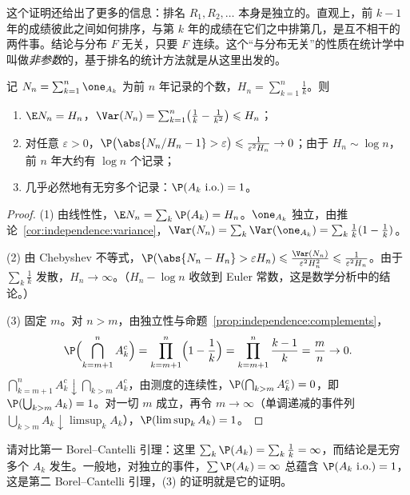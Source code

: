 \begin{remark}
这个证明还给出了更多的信息：排名 $R_1,R_2,\dots$ 本身是独立的。直观上，前 $k-1$ 年的成绩彼此之间如何排序，与第 $k$ 年的成绩在它们之中排第几，是互不相干的两件事。结论与分布 $F$ 无关，只要 $F$ 连续。这个“与分布无关”的性质在统计学中叫做\emph{非参数}的，基于排名的统计方法就是从这里出发的。
\end{remark}

\begin{corollary}[记录的个数]\label{cor:independence:records-count}
记 $N_n=\sum_{k=1}^n\one_{A_k}$ 为前 $n$ 年记录的个数，$H_n=\sum_{k=1}^n\frac1k$。则
\begin{enumerate}
\item $\E N_n=H_n$，$\Var(N_n)=\sum_{k=1}^n\bigl(\frac1k-\frac1{k^2}\bigr)\leqslant H_n$；
\item 对任意 $\varepsilon>0$，$\P\bigl(\abs{N_n/H_n-1}>\varepsilon\bigr)\leqslant\frac1{\varepsilon^2H_n}\to0$；由于 $H_n\sim\log n$，前 $n$ 年大约有 $\log n$ 个记录；
\item 几乎必然地有无穷多个记录：$\P(A_k\ \text{i.o.})=1$。
\end{enumerate}
\end{corollary}
\begin{proof}
(1) 由线性性，$\E N_n=\sum_k\P(A_k)=H_n$。$\one_{A_k}$ 独立，由推论~\ref{cor:independence:variance}，$\Var(N_n)=\sum_k\Var(\one_{A_k})=\sum_k\frac1k(1-\frac1k)$。

(2) 由 Chebyshev 不等式，$\P(\abs{N_n-H_n}>\varepsilon H_n)\leqslant\frac{\Var(N_n)}{\varepsilon^2H_n^2}\leqslant\frac1{\varepsilon^2H_n}$。由于 $\sum_k\frac1k$ 发散，$H_n\to\infty$。（$H_n-\log n$ 收敛到 Euler 常数，这是数学分析中的结论。）

(3) 固定 $m$。对 $n>m$，由独立性与命题~\ref{prop:independence:complements}，
\[
\P\Bigl(\bigcap_{k=m+1}^nA_k^c\Bigr)=\prod_{k=m+1}^n\Bigl(1-\frac1k\Bigr)=\prod_{k=m+1}^n\frac{k-1}k=\frac mn\to0 .
\]
$\bigcap_{k=m+1}^nA_k^c\downarrow\bigcap_{k>m}A_k^c$，由测度的连续性，$\P(\bigcap_{k>m}A_k^c)=0$，即 $\P(\bigcup_{k>m}A_k)=1$。对一切 $m$ 成立，再令 $m\to\infty$（单调递减的事件列 $\bigcup_{k>m}A_k\downarrow\limsup_kA_k$），$\P(\limsup_kA_k)=1$。
\end{proof}

请对比第一 Borel--Cantelli 引理：这里 $\sum_k\P(A_k)=\sum_k\frac1k=\infty$，而结论是无穷多个 $A_k$ 发生。一般地，对独立的事件，$\sum \P(A_k)=\infty$ 总蕴含 $\P(A_k\ \text{i.o.})=1$，这是第二 Borel--Cantelli 引理，(3) 的证明就是它的证明。


